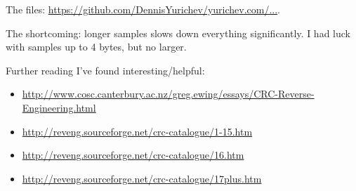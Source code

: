 The files: \url{https://github.com/DennisYurichev/yurichev.com/...}.

The shortcoming: longer samples slows down everything significantly.
I had luck with samples up to 4 bytes, but no larger.

Further reading I've found interesting/helpful:

\begin{itemize}

\item \url{http://www.cosc.canterbury.ac.nz/greg.ewing/essays/CRC-Reverse-Engineering.html}
\item \url{http://reveng.sourceforge.net/crc-catalogue/1-15.htm}
\item \url{http://reveng.sourceforge.net/crc-catalogue/16.htm}
\item \url{http://reveng.sourceforge.net/crc-catalogue/17plus.htm}

\end{itemize}

